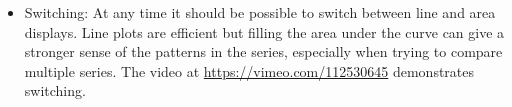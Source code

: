\documentclass[12pt]{article}
\begin{document}
\begin{itemize}


\item Switching: At any time it should be possible to switch between line and area displays. Line plots are efficient but filling the area under the curve can give a stronger sense of the patterns in the series, especially when trying to compare multiple series.   The video at \url{https://vimeo.com/112530645} demonstrates switching.





\end{itemize}
\end{document}
